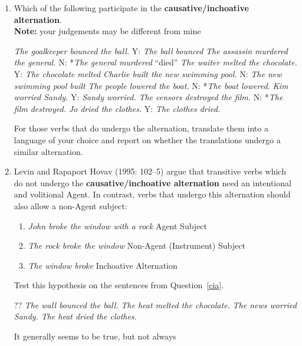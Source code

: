 \documentclass[a4paper]{article}
\begin{document}
\begin{enumerate}
\item  \label{cia} Which of the following participate in the
  \textbf{causative/inchoative alternation}.
  \\ \textbf{Note:} your judgements may be different from mine
  \begin{exe}
    \ex \textit{The goalkeeper bounced the ball.}
    \trans Y: \textit{The ball bounced}
    \ex \textit{The assassin murdered the general.}
    \trans N: *\textit{The general murdered} ``died''
    \ex \textit{The waiter melted the chocolate.}
    \trans Y: \textit{The chocolate melted}
    \ex \textit{Charlie built the new swimming pool.}
    \trans N: \textit{The new swimming pool built}
    \ex \textit{The people lowered the boat.}
    \trans N:  *\textit{The boat lowered.}
    \ex \textit{Kim worried Sandy.}
    \trans Y: \textit{Sandy worried.}
    \ex \textit{The censors destroyed the film.}
    \trans N:  *\textit{The film destroyed.}
    \ex \textit{Jo dried the clothes.}
    \trans Y:  \textit{The clothes dried.}
  \end{exe}
  For those verbs that do undergo the alternation, translate them
  into a language of your choice and report on whether the
  translations undergo a similar alternation.
\item Levin and Rapaport Hovav (1995: 102--5) argue that transitive
  verbs which do not undergo the \textbf{causative/inchoative
    alternation} need an intentional and volitional Agent.  In contrast,
  verbs that undergo this alternation should also allow a non-Agent subject:
  \begin{enumerate}
  \item \textit{John broke the window with a rock} \hfill Agent Subject
  \item \textit{The rock broke the window} \hfill Non-Agent (Instrument) Subject 
  \item \textit{The window broke} \hfill Inchoative Alternation
  \end{enumerate}
  Test this hypothesis on the sentences from Question~\ref{cia}.

  \begin{exe}
    \ex ?? \textit{The wall bounced the ball.}
    \ex \textit{The heat melted the chocolate.}
    \ex \textit{The news worried Sandy.}
    \ex \textit{The heat dried the clothes.}
  \end{exe}
It generally seems to be true, but not always
  

\end{enumerate}
\end{document}
